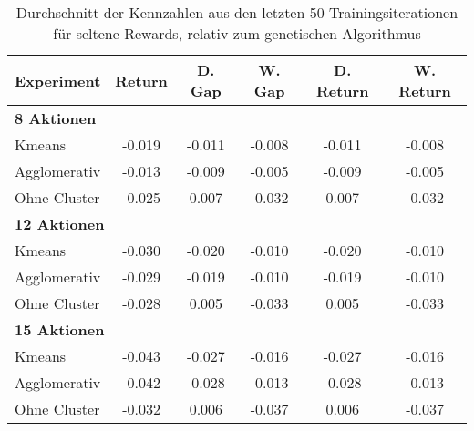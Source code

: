 \begin{table}[ht]
\centering
\caption{Durchschnitt der Kennzahlen aus den letzten 50 Trainingsiterationen für seltene Rewards, relativ zum genetischen Algorithmus}
\begin{tabular}{lccccc}
\hline
\textbf{Experiment} & \textbf{Return} & \textbf{D. Gap} & \textbf{W. Gap} & \textbf{D. Return} & \textbf{W. Return} \\
\hline
\multicolumn{6}{l}{\textbf{8 Aktionen}} \\
\hspace{1em}Kmeans & -0.019 & -0.011 & -0.008& -0.011 & -0.008 \\
\hspace{1em}Agglomerativ & -0.013 & -0.009 & -0.005& -0.009 & -0.005 \\
\hspace{1em}Ohne Cluster & -0.025 & 0.007 & -0.032& 0.007 & -0.032 \\
\hline
\multicolumn{6}{l}{\textbf{12 Aktionen}} \\
\hspace{1em}Kmeans & -0.030 & -0.020 & -0.010& -0.020 & -0.010 \\
\hspace{1em}Agglomerativ & -0.029 & -0.019 & -0.010& -0.019 & -0.010 \\
\hspace{1em}Ohne Cluster & -0.028 & 0.005 & -0.033& 0.005 & -0.033 \\
\hline
\multicolumn{6}{l}{\textbf{15 Aktionen}} \\
\hspace{1em}Kmeans & -0.043 & -0.027 & -0.016& -0.027 & -0.016 \\
\hspace{1em}Agglomerativ & -0.042 & -0.028 & -0.013& -0.028 & -0.013 \\
\hspace{1em}Ohne Cluster & -0.032 & 0.006 & -0.037& 0.006 & -0.037 \\
\hline
\end{tabular}
\end{table}


